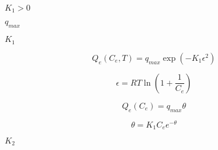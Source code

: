 \documentclass{article}
\begin{document}
$ K_1 > 0 $
\pagebreak

$ q_{max} $
\pagebreak

$ K_1 $
\pagebreak

\[
    Q_e (C_e, T) = q_{max} \exp( -K_1 \epsilon^2 )
\]
\pagebreak

\[
    \epsilon = R T \ln \left(1 + \frac{1}{C_e} \right)
\]
\pagebreak

\[
Q_e (C_e) = q_{max} \theta
\]
\pagebreak

\[
\theta = K_1 C_e e^{-\theta}
\]
\pagebreak

$ K_2 $
\pagebreak
\end{document}
